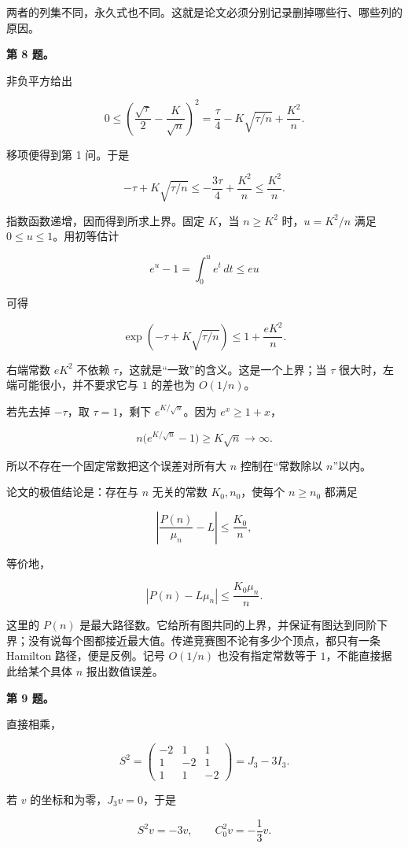\documentclass[11pt,a4paper]{article}
\begin{document}
两者的列集不同，永久式也不同。这就是论文必须分别记录删掉哪些行、哪些列的原因。

\textbf{第 8 题。}

非负平方给出

\[0\le
\left(\frac{\sqrt\tau}{2}-\frac K{\sqrt n}\right)^2
=\frac{\tau}{4}-K\sqrt{\tau/n}+\frac{K^2}{n}.\]

移项便得到第 1 问。于是

\[-\tau+K\sqrt{\tau/n}
\le-\frac{3\tau}{4}+\frac{K^2}{n}
\le\frac{K^2}{n}.\]

指数函数递增，因而得到所求上界。固定 \(K\)，当 \(n\ge K^2\) 时，\(u=K^2/n\) 满足 \(0\le u\le1\)。用初等估计

\[e^u-1=\int_0^u e^t\,dt\le eu\]

可得

\[\exp\!\left(-\tau+K\sqrt{\tau/n}\right)
\le 1+\frac{eK^2}{n}.\]

右端常数 \(eK^2\) 不依赖 \(\tau\)，这就是``一致''的含义。这是一个上界；当 \(\tau\) 很大时，左端可能很小，并不要求它与 \(1\) 的差也为 \(O(1/n)\)。

若先去掉 \(-\tau\)，取 \(\tau=1\)，剩下 \(e^{K/\sqrt n}\)。因为 \(e^x\ge1+x\)，

\[n\bigl(e^{K/\sqrt n}-1\bigr)\ge K\sqrt n\longrightarrow\infty.\]

所以不存在一个固定常数把这个误差对所有大 \(n\) 控制在``常数除以 \(n\)''以内。

论文的极值结论是：存在与 \(n\) 无关的常数 \(K_0,n_0\)，使每个 \(n\ge n_0\) 都满足

\[\left|\frac{P(n)}{\mu_n}-L\right|\le\frac{K_0}{n},\]

等价地，

\[|P(n)-L\mu_n|\le\frac{K_0\mu_n}{n}.\]

这里的 \(P(n)\) 是最大路径数。它给所有图共同的上界，并保证有图达到同阶下界；没有说每个图都接近最大值。传递竞赛图不论有多少个顶点，都只有一条 Hamilton 路径，便是反例。记号 \(O(1/n)\) 也没有指定常数等于 \(1\)，不能直接据此给某个具体 \(n\) 报出数值误差。

\textbf{第 9 题。}

直接相乘，

\[S^2=
\begin{pmatrix}-2&1&1\\1&-2&1\\1&1&-2\end{pmatrix}
=J_3-3I_3.\]

若 \(v\) 的坐标和为零，\(J_3v=0\)，于是

\[S^2v=-3v,\qquad
C_0^2v=-\frac13v.\]
\end{document}
